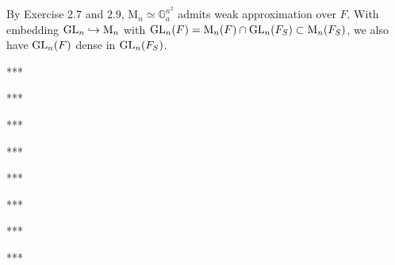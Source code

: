 \begin{problem}
By Exercise 2.7 and 2.9, $\mathrm{M}_{n} \simeq \mathbb{G}_{a}^{n^{2}}$ admits weak approximation over $F$.
With embedding $\operatorname{\mathrm{GL}}_{n} \hookrightarrow \mathrm{M}_{n}$ with $\operatorname{\mathrm{GL}}_{n}(F) = \mathrm{M}_{n}(F) \cap \operatorname{\mathrm{GL}}_{n}(F_S) \subset \mathrm{M}_{n}(F_{S})$,
we also have $\operatorname{\mathrm{GL}}_{n}(F)$ dense in $\operatorname{\mathrm{GL}}_{n}(F_S)$.
\end{problem}


\begin{problem} ***
\end{problem}
\begin{problem} ***
\end{problem}
\begin{problem} ***
\end{problem}
\begin{problem} ***
\end{problem}
\begin{problem} ***
\end{problem}
\begin{problem} ***
\end{problem}
\begin{problem} ***
\end{problem}
\begin{problem} ***
\end{problem}


